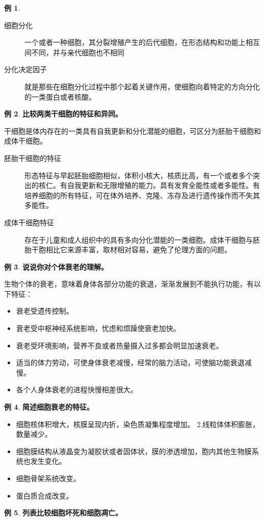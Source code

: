 \documentclass[UTF8]{article}
\theoremstyle{definition}
\newtheorem{example}{例}[section]
\begin{document}
\begin{example}
    \begin{description}
        \item[细胞分化] 一个或者一种细胞，其分裂增殖产生的后代细胞，在形态结构和功能上相互间不同，并与亲代细胞也不相同
        \item[分化决定因子] 就是那些在细胞分化过程中那个起着关键作用，使细胞向着特定的方向分化的一类蛋白或者核酸。
    \end{description}
\end{example}\begin{example}\textbf{比较两类干细胞的特征和异同。}
    
    干细胞是体内存在的一类具有自我更新和分化潜能的细胞，可区分为胚胎干细胞和成体干细胞。
    \begin{description}
        \item[胚胎干细胞的特征] 形态特征与早起胚胎细胞相似，体积小核大，核质比高，有一个或者多个突出的核仁。有自我更新和无限增殖的能力。具有发育全能性或者多能性。有培养细胞的所有特征，可在体外培养、克隆、冻存及进行遗传操作而不失其多能性。
        \item[成体干细胞特征] 存在于儿童和成人组织中的具有多向分化潜能的一类细胞。成体干细胞与胚胎干胞相比它来源丰富，取材相对容易，避免了伦理方面的问题。
    \end{description}
\end{example}\begin{example}\textbf{说说你对个体衰老的理解。}
    
    生物个体的衰老，意味着身体各部分功能的衰退，渐渐发展到不能执行功能，有以下特征：
    \begin{itemize}
        \item 衰老受遗传控制。
        \item 衰老受中枢神经系统影响，忧虑和烦躁使衰老加快。
        \item 衰老受环境影响，营养不良或者热量摄入过多都会明显加速衰老。
        \item 适当的体力劳动，可使身体衰老减慢，经常的脑力活动，可使脑功能衰退减慢。
        \item 各个人身体衰老的进程快慢相差很大。
    \end{itemize}
\end{example}\begin{example}\textbf{简述细胞衰老的特征。}
    
    \begin{itemize}
        \item 细胞核体积增大，核膜呈现内折，染色质凝集程度增加。 2.线粒体体积膨胀，数量减少。\item 细胞膜结构从液晶变为凝胶状或者固体状，膜的渗透增加，胞内其他生物膜系统也发生变化。\item 细胞骨架系统改变。\item 蛋白质合成改变。
    \end{itemize}
\end{example}\begin{example}\textbf{列表比较细胞坏死和细胞凋亡。}
    

\end{example}
\end{document}
